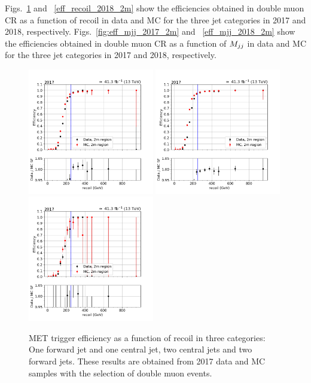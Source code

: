 Figs.~\ref{fig:eff_recoil_2017_2m} and ~\ref{eff_recoil_2018_2m} show the efficiencies obtained in double muon CR 
as a function of recoil in data and MC for the three jet categories in 2017 and 2018, respectively. 
Figs.~\ref{fig:eff_mjj_2017_2m} and ~\ref{eff_mjj_2018_2m} show the efficiencies obtained in double muon CR 
as a function of $M_{jj}$ in data and MC for the three jet categories in 2017 and 2018, respectively. 

\begin{figure}[htp]
    \begin{center}
        \includegraphics[width=0.49\textwidth]{fig/efficiency/trigger/met/recoil/data_mc_comparison_2m_2017_one_jet_forward_one_jet_central.png}
        \includegraphics[width=0.49\textwidth]{fig/efficiency/trigger/met/recoil/data_mc_comparison_2m_2017_two_central_jets.png} \\
        \includegraphics[width=0.49\textwidth]{fig/efficiency/trigger/met/recoil/data_mc_comparison_2m_2017_two_forward_jets.png}
    \end{center}
    \caption{MET trigger efficiency as a function of recoil in three categories: One forward jet and one central jet, two central jets and
            two forward jets. These results are obtained from 2017 data and MC samples with the selection of double muon events.} 
    \label{fig:eff_recoil_2017_2m}      
\end{figure}
